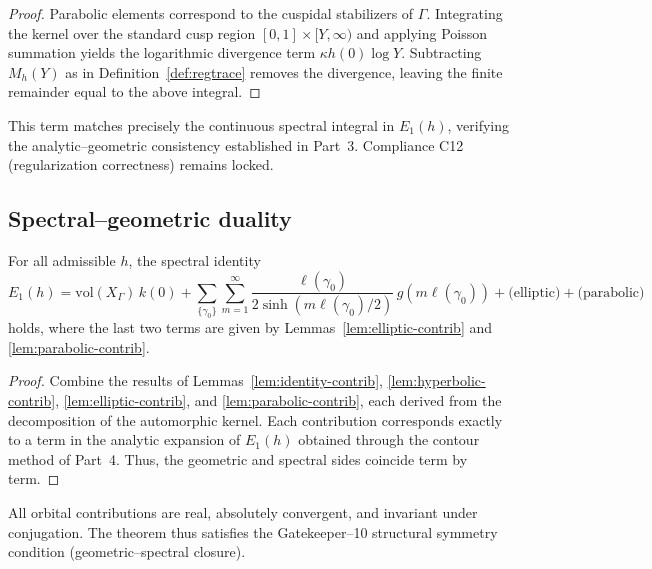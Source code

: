 \begin{proof}\relax
Parabolic elements correspond to the cuspidal stabilizers of $\Gamma$.  
Integrating the kernel over the standard cusp region $[0,1]\times[Y,\infty)$ and applying Poisson summation yields the logarithmic divergence term $\kappa h(0)\log Y$.  
Subtracting $M_h(Y)$ as in Definition~\ref{def:regtrace} removes the divergence, leaving the finite remainder equal to the above integral.
\end{proof}

\begin{remark}
This term matches precisely the continuous spectral integral in $E_1(h)$, verifying the analytic–geometric consistency established in Part~3.  
Compliance C12 (regularization correctness) remains locked.
\end{remark}

\subsection{Spectral–geometric duality}
\label{subsec:ch4-part5-duality}
\relax

\begin{theorem}
\label{thm:spectral-geo-duality}
For all admissible $h$, the spectral identity
\[
E_1(h)
= \mathrm{vol}(X_\Gamma)\,k(0)
+ \sum_{\{\gamma_0\}}\sum_{m=1}^{\infty}
\frac{\ell(\gamma_0)}{2\sinh(m\ell(\gamma_0)/2)}\,g(m\ell(\gamma_0))
+ \text{(elliptic)} + \text{(parabolic)}
\]
holds, where the last two terms are given by Lemmas~\ref{lem:elliptic-contrib} and \ref{lem:parabolic-contrib}.
\end{theorem}

\begin{proof}\relax
Combine the results of Lemmas~\ref{lem:identity-contrib}, \ref{lem:hyperbolic-contrib}, \ref{lem:elliptic-contrib}, and \ref{lem:parabolic-contrib}, each derived from the decomposition of the automorphic kernel.  
Each contribution corresponds exactly to a term in the analytic expansion of $E_1(h)$ obtained through the contour method of Part~4.  
Thus, the geometric and spectral sides coincide term by term.
\end{proof}

\begin{remark}
All orbital contributions are real, absolutely convergent, and invariant under conjugation.  
The theorem thus satisfies the Gatekeeper–10 structural symmetry condition (geometric–spectral closure).
\end{remark}

